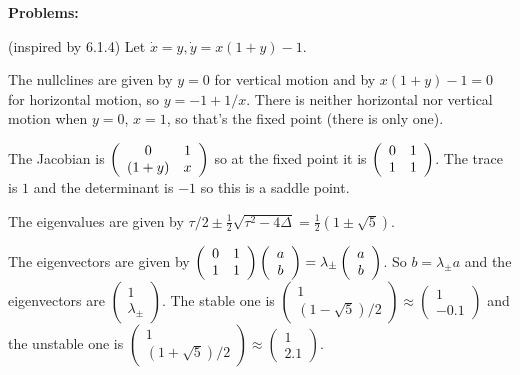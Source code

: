 \documentclass[12pt,letterpaper,answers]{exam}
\begin{document}
 \pdfpageheight 11in 
  \pdfpagewidth 8.5in
  
\noindent \textbf{ Problems:} 
\begin{questions}
\question (inspired by 6.1.4) Let $\dot{x} = y, \dot{y} = x(1+y)-1$.  
\begin{parts}
\item 

\begin{solution}
The nullclines are given by $y = 0$ for vertical motion and by $x(1+y) - 1 = 0$ for horizontal motion, so $y = -1 + 1/x$.  There is neither horizontal nor vertical motion when $y = 0$, $x = 1$, so that's the fixed point (there is only one).

The Jacobian is $\left(\begin{array}{c c} 0 & 1 \\ (1+y) & x \end{array}\right)$ so at the fixed point it is $\left(\begin{array}{c c} 0 & 1 \\ 1 & 1 \end{array}\right)$.  The trace is $1$ and the determinant is $-1$ so this is a saddle point.

The eigenvalues are given by $\tau/2 \pm \frac{1}{2}\sqrt{\tau^2 - 4\Delta} = \frac{1}{2}(1 \pm \sqrt{5})$.

The eigenvectors are given by $\left(\begin{array}{c c} 0 & 1 \\ 1 & 1 \end{array}\right)\left(\begin{array}{c} a \\ b\end{array}\right) = \lambda_{\pm}\left(\begin{array}{c} a \\ b\end{array}\right)$.  So $b = \lambda_{\pm} a$ and the eigenvectors are $\left(\begin{array}{c} 1 \\ \lambda_{\pm} \end{array}\right)$.  The stable one is $\left(\begin{array}{c} 1 \\ (1-\sqrt{5})/2 \end{array}\right) \approx \left(\begin{array}{c} 1 \\ -0.1 \end{array}\right)$ and the unstable one is $\left(\begin{array}{c} 1 \\ (1+\sqrt{5})/2 \end{array}\right) \approx \left(\begin{array}{c} 1 \\ 2.1 \end{array}\right)$.


\end{solution}
\end{parts}
\end{questions}
\end{document}
